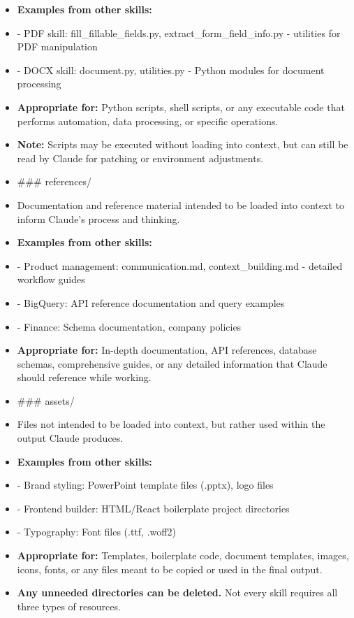 \documentclass[11pt]{article}
\begin{document}
\begin{itemize}[leftmargin=*,itemsep=2pt,topsep=2pt]
\item {} \textbf{Examples from other skills:}
\item {} - PDF skill: fill\_\allowbreak{}fillable\_\allowbreak{}fields.py, extract\_\allowbreak{}form\_\allowbreak{}field\_\allowbreak{}info.py - utilities for PDF manipulation
\item {} - DOCX skill: document.py, utilities.py - Python modules for document processing
\item {} \textbf{Appropriate for:} Python scripts, shell scripts, or any executable code that performs automation, data processing, or specific operations.
\item {} \textbf{Note:} Scripts may be executed without loading into context, but can still be read by Claude for patching or environment adjustments.
\item {} \#\#\# references/
\item {} Documentation and reference material intended to be loaded into context to inform Claude's process and thinking.
\item {} \textbf{Examples from other skills:}
\item {} - Product management: communication.md, context\_\allowbreak{}building.md - detailed workflow guides
\item {} - BigQuery: API reference documentation and query examples
\item {} - Finance: Schema documentation, company policies
\item {} \textbf{Appropriate for:} In-depth documentation, API references, database schemas, comprehensive guides, or any detailed information that Claude should reference while working.
\item {} \#\#\# assets/
\item {} Files not intended to be loaded into context, but rather used within the output Claude produces.
\item {} \textbf{Examples from other skills:}
\item {} - Brand styling: PowerPoint template files (.pptx), logo files
\item {} - Frontend builder: HTML/React boilerplate project directories
\item {} - Typography: Font files (.ttf, .woff2)
\item {} \textbf{Appropriate for:} Templates, boilerplate code, document templates, images, icons, fonts, or any files meant to be copied or used in the final output.
\item {} \textbf{Any unneeded directories can be deleted.} Not every skill requires all three types of resources.

\end{itemize}
\end{document}
